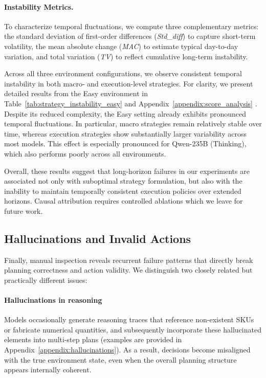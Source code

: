 \paragraph{Instability Metrics.}
To characterize temporal fluctuations, we compute three complementary metrics: the standard deviation of first-order differences (\textit{Std\_diff}) to capture short-term volatility, the mean absolute change (\textit{MAC}) to estimate typical day-to-day variation, and total variation (\textit{TV}) to reflect cumulative long-term instability.

Across all three environment configurations, we observe consistent temporal instability in both macro- and execution-level strategies. For clarity, we present detailed results from the Easy environment in Table~\ref{tab:strategy_instability_easy} and Appendix~\ref{appendix:score_analysis} . Despite its reduced complexity, the Easy setting already exhibits pronounced temporal fluctuations. In particular, macro strategies remain relatively stable over time, whereas execution strategies show substantially larger variability across most models. This effect is especially pronounced for Qwen-235B (Thinking), which also performs poorly across all environments.

Overall, these results suggest that long-horizon failures in our experiments are associated not only with suboptimal strategy formulation, but also with the inability to maintain temporally consistent execution policies over extended horizons. Causal attribution requires controlled ablations which we leave for future work.
\subsection{Hallucinations and Invalid Actions}

Finally, manual inspection reveals recurrent failure patterns that directly break planning correctness and action validity. We distinguish two closely related but practically different issues:

\paragraph{Hallucinations in reasoning}
Models occasionally generate reasoning traces that reference non-existent SKUs or fabricate numerical quantities, and subsequently incorporate these hallucinated elements into multi-step plans (examples are provided in Appendix~\ref{appendix:hallucinations}). As a result, decisions become misaligned with the true environment state, even when the overall planning structure appears internally coherent.


